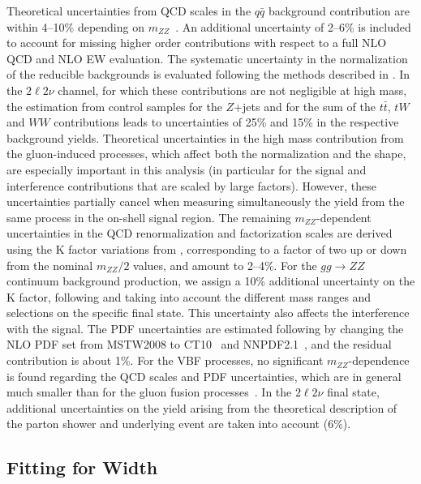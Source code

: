 Theoretical uncertainties from QCD scales in the $q\bar{q}$ background contribution are
within 4--10\% depending on $m_{ZZ}$~\cite{Chatrchyan:2013mxa}. An additional uncertainty of
2--6\% is included to account for missing higher order contributions with respect to a full NLO
QCD and NLO EW evaluation. The systematic uncertainty
in the normalization of the reducible backgrounds is evaluated following the methods
described in \cite{Chatrchyan:2013mxa,Chatrchyan:2013yoa}. In the $2\ell 2\nu$
channel, for which these contributions are not negligible at high mass, the estimation
from control samples for the $Z$+jets and for the sum of the $t\bar{t}$, $tW$
and $WW$ contributions leads to uncertainties of 25\% and 15\% in the respective background
yields. Theoretical uncertainties in the high mass contribution from the gluon-induced
processes, which affect both the normalization and the shape, are especially important
in this analysis (in particular for the signal and interference contributions that
are scaled by large factors). However, these uncertainties partially cancel when
measuring simultaneously the yield from the same process in the on-shell signal region. The
remaining $m_{ZZ}$-dependent uncertainties in the QCD renormalization and factorization
scales are derived using the K factor variations from \cite{Passarino:2013bha},
corresponding to a factor of two up or down from the nominal $m_{ZZ}/2$ values,
and amount to 2--4\%. For the $gg \to ZZ$ continuum background production, we assign
a 10\% additional uncertainty on the K factor, following \cite{Bonvini:2013jha} and
taking into account the different mass ranges and selections on the specific final state. This
uncertainty also affects the interference with the signal. The PDF uncertainties are estimated
following \cite{Alekhin:2011sk, Botje:2011sn} by changing the NLO PDF set from \textsc{MSTW2008} to \textsc{CT10}~\cite{Lai:2010vv}
and NNPDF2.1~\cite{Ball:2011mu}, and the residual contribution is about 1\%. For the VBF processes,
no significant $m_{ZZ}$-dependence is found regarding the QCD scales and PDF uncertainties, which
are in general much smaller than for the gluon fusion processes~\cite{Dittmaier:2011ti,Heinemeyer:2013tqa}.
In the $2\ell 2\nu$ final state, additional uncertainties on the yield arising from the theoretical
description of the parton shower and underlying event are taken into account (6\%).

\subsection{Fitting for Width}
\label{sec:Final_fit_width}

